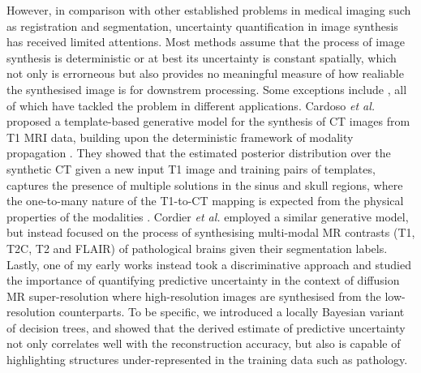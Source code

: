 However, in comparison with other established problems in medical imaging such as registration and segmentation, uncertainty quantification in image synthesis has received limited attentions. Most methods assume that the process of image synthesis is deterministic or at best its uncertainty is constant spatially, which not only is errorneous but also provides no meaningful measure of how realiable the synthesised image is for downstrem processing. Some exceptions include \cite{cardoso2015template,cordier2016extended,tanno2016bayesian}, all of which have tackled the problem in different applications. Cardoso \textit{et al.} \cite{cardoso2015template} proposed a template-based generative model for the synthesis of CT images from T1 MRI data, building upon the deterministic framework of modality propagation \cite{ye2013modality}. They showed that the estimated posterior distribution over the synthetic CT given a new input T1 image and training pairs of templates, captures the presence of multiple solutions in the sinus and skull regions, where the one-to-many nature of the T1-to-CT mapping is expected from the physical properties of the modalities \cite{burgos2014attenuation}. Cordier \textit{et al.} \cite{cordier2016extended} employed a similar generative model, but instead focused on the process of synthesising multi-modal MR contrasts (T1, T2C, T2 and FLAIR) of pathological brains given their segmentation labels. Lastly, one of my early works \cite{tanno2016bayesian} instead took a discriminative approach and studied the importance of quantifying predictive uncertainty in the context of diffusion MR super-resolution where high-resolution images are synthesised from the low-resolution counterparts. To be specific, we introduced a locally Bayesian variant of decision trees, and showed that the derived estimate of predictive uncertainty not only correlates well with the reconstruction accuracy, but also is capable of highlighting structures under-represented in the training data such as pathology. 



